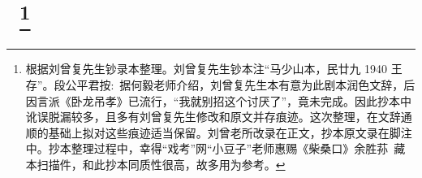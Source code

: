 \newpage
{} %
\section*{\large{}~\protect\footnote{根据刘曾复先生钞录本整理。刘曾复先生钞本注``马少山本，民廿九 1940  王存''。段公平{\scriptsize 君}按:~据何毅老师介绍，刘曾复先生本有意为此剧本润色文辞，后因言派《卧龙吊孝》已流行，``我就别招这个讨厌了''，竟未完成。因此抄本中讹误脱漏较多，且多有刘曾复先生修改和原文并存痕迹。这次整理，在文辞通顺的基础上拟对这些痕迹适当保留。刘曾老所改录在正文，抄本原文录在脚注中。抄本整理过程中，幸得``戏考''网``小豆子''老师惠赐《柴桑口》余胜荪~藏本扫描件，和此抄本同质性很高，故多用为参考。}}

